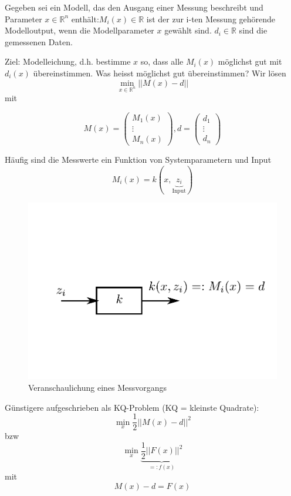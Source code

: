 \documentclass[10pt,a4paper]{article}
\begin{document}
\begin{bsp}
Gegeben sei ein Modell, das den Ausgang einer Messung beschreibt und Parameter $x \in \mathbb{R}^{n}$ enthält:$M_i (x) \in \mathbb{R}$ ist der zur i-ten Messung gehörende Modelloutput, wenn die Modellparameter $x$ gewählt sind. $d_i \in \mathbb{R}$ sind die gemessenen Daten.

Ziel: Modelleichung, d.h. bestimme $x$ so, dass alle $M_i(x)$ möglichst gut mit $d_i(x)$ übereinstimmen. Was heisst möglichst gut übereinstimmen? Wir lösen $$\min\limits_{x \in \mathbb{R}^{n}} ||M(x)-d||$$ mit 

$$M(x)=\begin{pmatrix}
M_1(x)  \\ \vdots \\ M_n(x)
\end{pmatrix} ,
d=\begin{pmatrix}
d_1  \\ \vdots \\ d_n
\end{pmatrix}$$

Häufig sind die Messwerte ein Funktion von Systemparametern und Input $$M_i(x)=k(x,\underbrace{z_i}_{\text{Input}})$$

\begin{figure}[H]
\includegraphics[width=\textwidth]{images/messvorgang}
\caption{Veranschaulichung eines Messvorgangs}
\end{figure}

Günstigere aufgeschrieben als KQ-Problem (KQ = kleinste Quadrate): $$\min\limits_{x} \frac{1}{2}||M(x)-d||^{2}$$ bzw $$\min\limits_{x} \underbrace{ \frac{1}{2}||F(x)||^{2}}_{=:f(x)}$$ mit $$M(x)-d=F(x)$$


\end{bsp}
\end{document}
